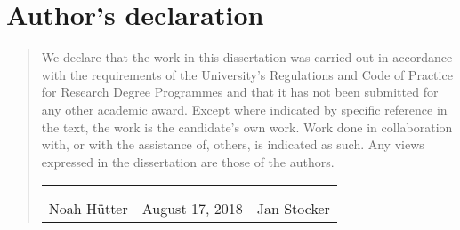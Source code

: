 \chapter*{Author's declaration}
\begin{SingleSpace}
\begin{quote}
We declare that the work in this dissertation was carried out in accordance with
the requirements of  the University's Regulations and Code of Practice for
Research Degree Programmes and that it  has not been submitted for any other
academic award. Except where indicated by specific  reference in the text, the
work is the candidate's own work. Work done in collaboration with, or with the
assistance of, others, is indicated as such. Any views expressed in the
dissertation are those of the authors.

\vspace{3cm}

\begin{table}[h!]
    \centering
    \begin{tabular}{p{5cm} p{3cm} p{5cm}}
         & & \\ \cline{1-1} \cline{3-3} 
        \vspace{1ex} & & \\
        \multicolumn{1}{c}{Noah H\"utter} &
        August 17, 2018
         & \multicolumn{1}{c}{Jan Stocker} \\
    \end{tabular}
\end{table}




\end{quote}
\end{SingleSpace}
\clearpage